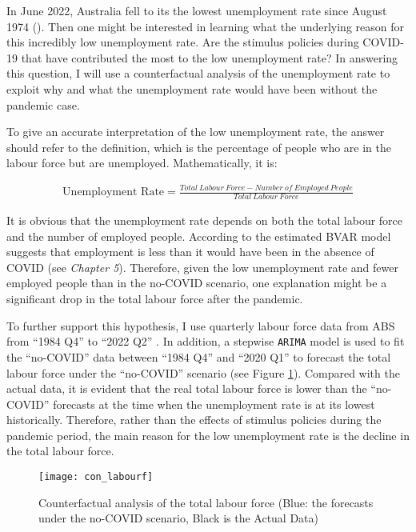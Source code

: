 \documentclass{monashthesis}
\begin{document}
In June 2022, Australia fell to its the lowest unemployment rate since August 1974 (\textcite{ABS2022a}). Then one might be interested in learning what the underlying reason for this incredibly low unemployment rate. Are the stimulus policies during COVID-19 that have contributed the most to the low unemployment rate? In answering this question, I will use a counterfactual analysis of the unemployment rate to exploit why and what the unemployment rate would have been without the pandemic case.

To give an accurate interpretation of the low unemployment rate, the answer should refer to the definition, which is the percentage of people who are in the labour force but are unemployed. Mathematically, it is:

\[
\begin{aligned}
\text{Unemployment Rate}=\frac{Total\ Labour\  Force- Number\ of \ Employed \ People}{Total\ Labour \ Force}
\label{equ:unemp}
\end{aligned}
\]

It is obvious that the unemployment rate depends on both the total labour force and the number of employed people. According to the estimated BVAR model suggests that employment is less than it would have been in the absence of COVID (see \emph{Chapter 5}). Therefore, given the low unemployment rate and fewer employed people than in the no-COVID scenario, one explanation might be a significant drop in the total labour force after the pandemic.

To further support this hypothesis, I use quarterly labour force data from ABS from ``1984 Q4'' to ``2022 Q2'' \autocite{ABS2022}. In addition, a stepwise \texttt{ARIMA} model \autocite{fpp3} is used to fit the ``no-COVID'' data between ``1984 Q4'' and ``2020 Q1'' to forecast the total labour force under the ``no-COVID'' scenario (see Figure \ref{fig:lab}). Compared with the actual data, it is evident that the real total labour force is lower than the ``no-COVID'' forecasts at the time when the unemployment rate is at its lowest historically. Therefore, rather than the effects of stimulus policies during the pandemic period, the main reason for the low unemployment rate is the decline in the total labour force.

\begin{figure}[H]
\texttt{[image: con\_labourf]}
\centering
\caption{Counterfactual analysis of the total labour force (Blue: the forecasts under the no-COVID scenario, Black is the Actual Data)}
\label{fig:lab}
\end{figure}
\end{document}
